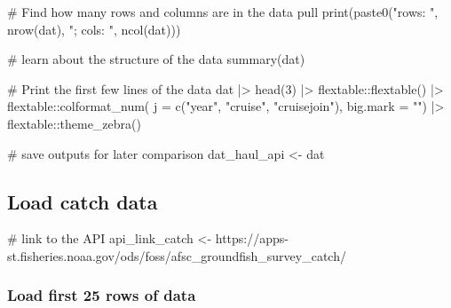 \documentclass[
  letterpaper,
  oneside,
  open=any]{scrbook}
\newenvironment{Shaded}{\begin{snugshade}}{\end{snugshade}}
\newcommand{\AttributeTok}[1]{\textcolor[rgb]{0.40,0.45,0.13}{#1}}
\newcommand{\CommentTok}[1]{\textcolor[rgb]{0.37,0.37,0.37}{#1}}
\newcommand{\DecValTok}[1]{\textcolor[rgb]{0.68,0.00,0.00}{#1}}
\newcommand{\FunctionTok}[1]{\textcolor[rgb]{0.28,0.35,0.67}{#1}}
\newcommand{\NormalTok}[1]{\textcolor[rgb]{0.00,0.23,0.31}{#1}}
\newcommand{\OtherTok}[1]{\textcolor[rgb]{0.00,0.23,0.31}{#1}}
\newcommand{\SpecialCharTok}[1]{\textcolor[rgb]{0.37,0.37,0.37}{#1}}
\newcommand{\StringTok}[1]{\textcolor[rgb]{0.13,0.47,0.30}{#1}}
\begin{document}
\begin{Shaded}
\begin{Highlighting}[]
\CommentTok{\# Find how many rows and columns are in the data pull}
\FunctionTok{print}\NormalTok{(}\FunctionTok{paste0}\NormalTok{(}\StringTok{"rows: "}\NormalTok{, }\FunctionTok{nrow}\NormalTok{(dat), }\StringTok{"; cols: "}\NormalTok{, }\FunctionTok{ncol}\NormalTok{(dat)))}

\CommentTok{\# learn about the structure of the data}
\FunctionTok{summary}\NormalTok{(dat)}

\CommentTok{\# Print the first few lines of the data }
\NormalTok{dat }\SpecialCharTok{|\textgreater{}} 
  \FunctionTok{head}\NormalTok{(}\DecValTok{3}\NormalTok{) }\SpecialCharTok{|\textgreater{}} 
\NormalTok{  flextable}\SpecialCharTok{::}\FunctionTok{flextable}\NormalTok{() }\SpecialCharTok{|\textgreater{}}
\NormalTok{  flextable}\SpecialCharTok{::}\FunctionTok{colformat\_num}\NormalTok{(}
      \AttributeTok{j =} \FunctionTok{c}\NormalTok{(}\StringTok{"year"}\NormalTok{, }\StringTok{"cruise"}\NormalTok{, }\StringTok{"cruisejoin"}\NormalTok{), }
      \AttributeTok{big.mark =} \StringTok{""}\NormalTok{) }\SpecialCharTok{|\textgreater{}} 
\NormalTok{  flextable}\SpecialCharTok{::}\FunctionTok{theme\_zebra}\NormalTok{()}

\CommentTok{\# save outputs for later comparison}
\NormalTok{dat\_haul\_api }\OtherTok{\textless{}{-}}\NormalTok{ dat}
\end{Highlighting}
\end{Shaded}

\subsection{Load catch data}\label{load-catch-data}

\begin{Shaded}
\begin{Highlighting}[]
\CommentTok{\# link to the API}
\NormalTok{api\_link\_catch }\OtherTok{\textless{}{-}} \StringTok{\textquotesingle{}https://apps{-}st.fisheries.noaa.gov/ods/foss/afsc\_groundfish\_survey\_catch/\textquotesingle{}}
\end{Highlighting}
\end{Shaded}

\subsubsection{Load first 25 rows of
data}\label{load-first-25-rows-of-data-1}
\end{document}
